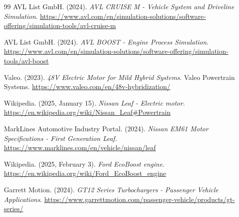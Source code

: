 \documentclass[12pt,a4paper]{report}
\begin{document}
\begin{thebibliography}{99}
AVL List GmbH. (2024). \textit{AVL CRUISE M - Vehicle System and Driveline Simulation}. \url{https://www.avl.com/en/simulation-solutions/software-offering/simulation-tools/avl-cruise-m}

AVL List GmbH. (2024). \textit{AVL BOOST - Engine Process Simulation}. \url{https://www.avl.com/en/simulation-solutions/software-offering/simulation-tools/avl-boost}

Valeo. (2023). \textit{48V Electric Motor for Mild Hybrid Systems}. Valeo Powertrain Systems. \url{https://www.valeo.com/en/48v-hybridization/}

Wikipedia. (2025, January 15). \textit{Nissan Leaf - Electric motor}. \url{https://en.wikipedia.org/wiki/Nissan_Leaf#Powertrain}

MarkLines Automotive Industry Portal. (2024). \textit{Nissan EM61 Motor Specifications - First Generation Leaf}. \url{https://www.marklines.com/en/vehicle/nissan/leaf}

Wikipedia. (2025, February 3). \textit{Ford EcoBoost engine}. \url{https://en.wikipedia.org/wiki/Ford_EcoBoost_engine}

Garrett Motion. (2024). \textit{GT12 Series Turbochargers - Passenger Vehicle Applications}. \url{https://www.garrettmotion.com/passenger-vehicle/products/gt-series/}


\end{thebibliography}
\end{document}
